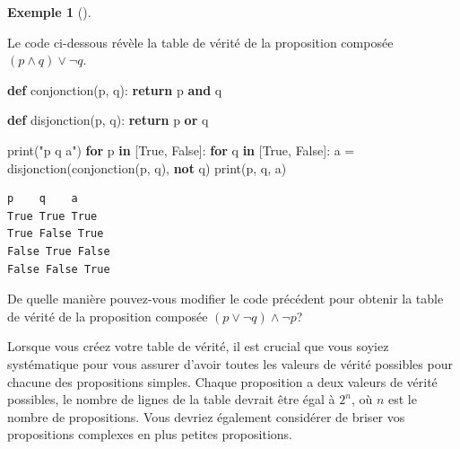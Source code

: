 \documentclass[
  letterpaper,
]{scrbook}
\newenvironment{Shaded}{}{}
\newcommand{\BuiltInTok}[1]{#1}
\newcommand{\ControlFlowTok}[1]{\textcolor[rgb]{0.00,0.44,0.13}{\textbf{#1}}}
\newcommand{\KeywordTok}[1]{\textcolor[rgb]{0.00,0.44,0.13}{\textbf{#1}}}
\newcommand{\NormalTok}[1]{#1}
\newcommand{\OperatorTok}[1]{\textcolor[rgb]{0.40,0.40,0.40}{#1}}
\newcommand{\StringTok}[1]{\textcolor[rgb]{0.25,0.44,0.63}{#1}}
\newcommand{\VariableTok}[1]{\textcolor[rgb]{0.10,0.09,0.49}{#1}}
\theoremstyle{definition}
\newtheorem{example}{Exemple}[chapter]
\theoremstyle{definition}
\theoremstyle{plain}
\theoremstyle{remark}
\begin{document}
\leavevmode{}%
\begin{example}[]\label{exm-proposition-compose}

Le code ci-dessous révèle la table de vérité de la proposition composée
\((p \wedge q) \vee \lnot q\).

\hypertarget{prop-composee-1}{}
\begin{Shaded}
\begin{Highlighting}[]
\KeywordTok{def}\NormalTok{ conjonction(p, q):}
    \ControlFlowTok{return}\NormalTok{ p }\KeywordTok{and}\NormalTok{ q}

\KeywordTok{def}\NormalTok{ disjonction(p, q):}
    \ControlFlowTok{return}\NormalTok{ p }\KeywordTok{or}\NormalTok{ q}

\BuiltInTok{print}\NormalTok{(}\StringTok{"p    q    a"}\NormalTok{)}
\ControlFlowTok{for}\NormalTok{ p }\KeywordTok{in}\NormalTok{ [}\VariableTok{True}\NormalTok{, }\VariableTok{False}\NormalTok{]:}
    \ControlFlowTok{for}\NormalTok{ q }\KeywordTok{in}\NormalTok{ [}\VariableTok{True}\NormalTok{, }\VariableTok{False}\NormalTok{]:}
\NormalTok{        a }\OperatorTok{=}\NormalTok{ disjonction(conjonction(p, q), }\KeywordTok{not}\NormalTok{ q)}
        \BuiltInTok{print}\NormalTok{(p, q, a)}
\end{Highlighting}
\end{Shaded}

\begin{verbatim}
p    q    a
True True True
True False True
False True False
False False True
\end{verbatim}

De quelle manière pouvez-vous modifier le code précédent pour obtenir la
table de vérité de la proposition composée
\((p \vee \lnot q) \wedge \lnot p\)?

\end{example}

Lorsque vous créez votre table de vérité, il est crucial que vous soyiez
systématique pour vous assurer d'avoir toutes les valeurs de vérité
possibles pour chacune des propositions simples. Chaque proposition a
deux valeurs de vérité possibles, le nombre de lignes de la table
devrait être égal à \(2^n\), où \(n\) est le nombre de propositions.
Vous devriez également considérer de briser vos propositions complexes
en plus petites propositions.
\end{document}
